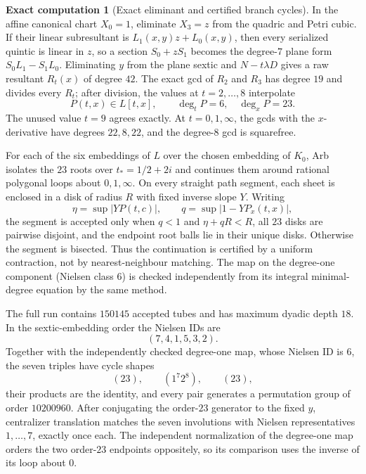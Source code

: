 \documentclass[11pt]{amsart}
\theoremstyle{definition}
\newtheorem{computation}[computation]{Exact computation}
\theoremstyle{remark}
\begin{document}
\smallskip
\begin{computation}[Exact eliminant and certified branch cycles]
\label{comp:hurwitz-branch-cycles}
In the affine canonical chart $X_0=1$, eliminate $X_3=z$ from the quadric and
Petri cubic.  If their linear subresultant is $L_1(x,y)z+L_0(x,y)$, then every
serialized quintic is linear in $z$, so a section $S_0+zS_1$ becomes the
degree-$7$ plane form $S_0L_1-S_1L_0$.  Eliminating $y$ from the plane sextic
and $N-t\lambda D$ gives a raw resultant $R_t(x)$ of degree $42$.  The exact
gcd of $R_2$ and $R_3$ has degree $19$ and divides every $R_t$; after division,
the values at $t=2,\ldots,8$ interpolate
\[
 P(t,x)\in L[t,x],\qquad \deg_tP=6,\quad \deg_xP=23.
\]
The unused value $t=9$ agrees exactly.  At $t=0,1,\infty$, the gcds with the
$x$-derivative have degrees $22,8,22$, and the degree-$8$ gcd is squarefree.

\smallskip
For each of the six embeddings of $L$ over the chosen embedding of $K_0$, Arb
isolates the $23$ roots over $t_*=1/2+2i$ and continues them around rational
polygonal loops about $0,1,\infty$.  On every straight path segment, each
sheet is enclosed in a disk of radius $R$ with fixed inverse slope $Y$.
Writing
\[
 \eta=\sup|Y P(t,c)|,
 \qquad q=\sup|1-Y P_x(t,x)|,
\]
the segment is accepted only when $q<1$ and $\eta+qR<R$, all $23$ disks are
pairwise disjoint, and the endpoint root balls lie in their unique disks.
Otherwise the segment is bisected.  Thus the continuation is certified by a
uniform contraction, not by nearest-neighbour matching.  The map on the
degree-one component (Nielsen class $6$) is checked independently from its
integral minimal-degree equation by the same method.

\smallskip
The full run contains $150145$ accepted tubes and has maximum dyadic depth
$18$.  In the sextic-embedding order the Nielsen IDs are
\[
 (7,4,1,5,3,2).
\]
Together with the independently checked degree-one map, whose Nielsen ID is
$6$, the seven triples
have cycle shapes
\[
 (23),\qquad(1^7 2^8),\qquad(23),
\]
their products are the identity, and every pair generates a permutation
group of order $10200960$.  After conjugating the order-$23$ generator to the
fixed $y$, centralizer translation matches the seven involutions with Nielsen
representatives $1,\ldots,7$, exactly once each.  The independent normalization
of the degree-one map orders the two order-$23$ endpoints oppositely, so its
comparison
uses the inverse of its loop about $0$.
\end{computation}
\end{document}
